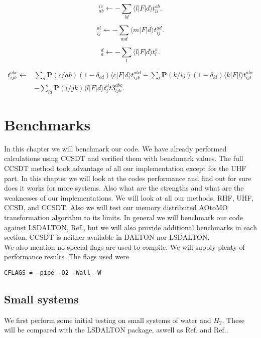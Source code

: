 \begin{equation}
[X1]_{ab}^{ic} \leftarrow - \sum_{ld} \langle l | F | d \rangle t_{li}^{ab} .
\end{equation}

\begin{equation}
[X15]_{ij}^{al} \leftarrow - \sum_{md} \langle m | F | d \rangle t_{ij}^{ad} .
\end{equation}

\begin{equation}
[X8]_a^d \leftarrow - \sum_l \langle l | F | d \rangle t_l^a .
\end{equation}

\begin{align}
t_{ijk}^{abc} \leftarrow &
\sum_d \textbf{P}(c/ab)
(1 - \delta_{cd}) \langle c | F | d \rangle t_{ijk}^{abd}
- \sum_l \textbf{P}(k/ij) 
(1 - \delta_{kl}) \langle k | F | l \rangle  t_{ijl}^{abc}
\nonumber \\ &
-
\sum_{ld}
\textbf{P}(i/jk)
\langle l | F | d \rangle t_i^d  t3^{abc}_{ljk} .
\end{align}


\chapter{Benchmarks}
In this chapter we will benchmark our code. We have already performed calculations using CCSDT and verified them with benchmark values. The full CCSDT method took advantage of all our implementation except for the UHF part. In this chapter we will look at the codes performance and find out for sure does it works for more systems. Also what are the strengths and what are the weaknesses of our implementations. We will look at all our methods, RHF, UHF, CCSD, and CCSDT. Also we will test our memory distributed AOtoMO transformation algorithm to its limits. In general we will benchmark our code against LSDALTON, Ref.\cite{LSDALTON_CITATION}, but we will also provide additional benchmarks in each section. CCSDT is neither available in DALTON nor LSDALTON. \\

We also mention no special flags are used to compile. We will supply plenty of performance results. The flags used were 

\begin{lstlisting}
CFLAGS = -pipe -O2 -Wall -W 
\end{lstlisting}

\section{Small systems}
We first perform some initial testing on small systems of water and $H_2$. These will be compared with the LSDALTON package, aswell as Ref.\cite{ccsd_benchmark_url_stuff} and Ref.\cite{CCSDT-ref1}. \\

